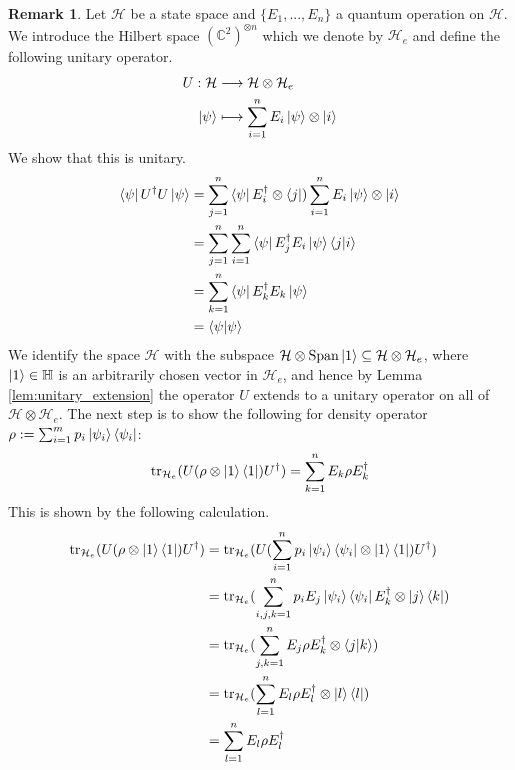 \documentclass[12pt]{article}
\theoremstyle{plain}
\theoremstyle{definition}
\newtheorem{remark}[thm]{Remark}
\newcommand{\bb}[1]{\mathbb{#1}}
\newcommand{\call}[1]{\mathcal{#1}}
\newcommand{\lto}{\longrightarrow}
\begin{document}
	\begin{remark}
		Let $\call{H}$ be a state space and $\lbrace E_1,...,E_n\rbrace$ a quantum operation on $\call{H}$. We introduce the Hilbert space $(\bb{C}^2)^{\otimes n}$ which we denote by $\call{H}_e$ and define the following unitary operator.
		\begin{align}
			U: \call{H}&\lto \call{H} \otimes \call{H}_e\\
			\ket{\psi} &\longmapsto \sum_{i = 1}^n E_i \ket{\psi} \otimes \ket{i}
		\end{align}
	We show that this is unitary.
	\begin{align*}
		\bra{\psi} U^\dagger U \ket{\psi} &= \sum_{j = 1}^n \bra{\psi} E_i^\dagger \otimes \bra{j})\sum_{i = 1}^n E_i \ket{\psi} \otimes \ket{i}\\
		&= \sum_{j = 1}^n \sum_{i= 1}^n \bra{\psi}E_j^\dagger E_i \ket{\psi} \bra{j}\ket{i}\\
		&= \sum_{k = 1}^n \bra{\psi} E_k^\dagger E_k \ket{\psi}\\
		&= \bra{\psi}\ket{\psi}
	\end{align*}
We identify the space $\call{H}$ with the subspace $\call{H} \otimes \operatorname{Span}\ket{1} \subseteq \call{H} \otimes \call{H}_e$, where $\ket{1} \in \bb{H}$ is an arbitrarily chosen vector in $\call{H}_e$, and hence by Lemma \ref{lem:unitary_extension} the operator $U$ extends to a unitary operator on all of $\call{H} \otimes \call{H}_e$. The next step is to show the following for density operator $\rho := \sum_{i = 1}^m p_i \ket{\psi_i}\bra{\psi_i}$:
\begin{equation}
	\operatorname{tr}_{\call{H}_e}(U(\rho \otimes \ket{1}\bra{1})U^\dagger) = \sum_{k = 1}^n E_k \rho E_k^\dagger
\end{equation}
This is shown by the following calculation.
\begin{align*}
	\operatorname{tr}_{\call{H}_e}(U(\rho \otimes \ket{1}\bra{1})U^\dagger) &= \operatorname{tr}_{\call{H}_e}(U (\sum_{i = 1}^n p_i \ket{\psi_i}\bra{\psi_i} \otimes \ket{1}\bra{1})U^\dagger)\\
	&= \operatorname{tr}_{\call{H}_e}(\sum_{i,j,k = 1}^n p_i E_j \ket{\psi_i}\bra{\psi_i}E_k^\dagger \otimes \ket{j}\bra{k})\\
	&= \operatorname{tr}_{\call{H}_e}(\sum_{j,k = 1}^n E_j \rho E_k^\dagger \otimes \bra{j}\ket{k})\\
	&= \operatorname{tr}_{\call{H}_e}(\sum_{l = 1}^n E_l \rho E_l^\dagger \otimes \ket{l}\bra{l})\\
	&= \sum_{l = 1}^n E_l \rho E_l^\dagger
\end{align*}
	\end{remark}
	
\end{document}
